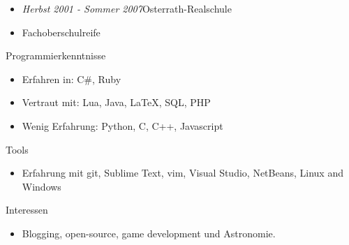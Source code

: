 \documentclass[12pt]{article}
\begin{document}
\begin{itemize}
  \setlength{\itemsep}{0cm}
  \setlength{\parskip}{0.1cm}
  \item[] \emph{Herbst 2001 - Sommer 2007}\hfill Osterrath-Realschule
  \item[] Fachoberschulreife
\end{itemize}

\newpage

\vspace{0.5cm}
{\Large Programmierkenntnisse}
\begin{itemize}
  \setlength{\itemsep}{0cm}
  \setlength{\parskip}{0cm}
  \item[] Erfahren in: C\#, Ruby
  \item[] Vertraut mit: Lua, Java, LaTeX, SQL, PHP
  \item[] Wenig Erfahrung: Python, C, C++, Javascript
\end{itemize}

\vspace{0.5cm}
{\Large Tools}
\begin{itemize}
  \setlength{\itemsep}{0cm}
  \setlength{\parskip}{0cm}
  \item[] Erfahrung mit git, Sublime Text, vim, Visual Studio, NetBeans, Linux and Windows
\end{itemize}

\vspace{0.5cm}
{\Large Interessen}
\begin{itemize}
  \setlength{\itemsep}{0cm}
  \setlength{\parskip}{0cm}
  \item[] Blogging, open-source, game development und Astronomie.
\end{itemize}
\end{document}

